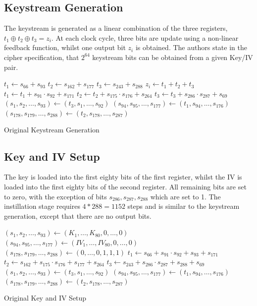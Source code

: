 \documentclass[conference]{IEEEtran}
\begin{document}
\subsection{Keystream Generation}\label{sec:key-gen-o}
The keystream is generated as a linear combination of the three registers, $t_1\oplus t_2\oplus t_3=z_i$. At each clock cycle, three bits are update using a non-linear feedback function, whilst one output bit $z_i$ is obtained. The authors state in the cipher specification, that $2^{64}$ keystream bits can be obtained from a given Key/IV pair.

\begin{algorithm}[H]
\begin{algorithmic}[1]
 
\State $t_1 \gets s_{66} + s_{93}$
\State $t_2 \gets s_{162} + s_{177}$
\State $t_3 \gets s_{243} + s_{288}$
\State
\State $z_i \gets t_1 + t_2 + t_3$
\State
\State $t_1 \gets t_1 + s_{91} \cdot s_{92} + s_{171}$
\State $t_2 \gets t_2 + s_{175} \cdot s_{176} + s_{264}$
\State $t_3 \gets t_3 + s_{286} \cdot s_{287} + s_{69}$
\State
\State $(s_1,s_2,\dots,s_{93}) \gets (t_3,s_1,\dots,s_{92})$
\State $(s_{94},s_{95},\dots,s_{177}) \gets (t_1,s_{94},\dots,s_{176})$
\State $(s_{178},s_{179},\dots,s_{288}) \gets (t_2,s_{178},\dots,s_{287})$
\EndFor
\end{algorithmic}
\caption{Original Keystream Generation}
\end{algorithm}

\subsection{Key and IV Setup}\label{sec:key-iv-o}
The key is loaded into the first eighty bits of the first register, whilst the IV is loaded into the first eighty bits of the second register. All remaining bits are set to zero, with the exception of bits $s_{286},s_{287},s_{288}$ which are set to 1. The instillation stage requires $4*288=1152$ steps and is similar to the keystream generation, except that there are no output bits.

\begin{algorithm}[H]
\begin{algorithmic}[1]
\State $(s_1,s_2,\dots,s_{93}) \gets (K_1,\dots,K_{80},0,\dots,0)$
\State $(s_{94},s_{95},\dots,s_{177}) \gets (IV_1,\dots,IV_{80},0,\dots,0)$
\State $(s_{178},s_{179},\dots,s_{288}) \gets (0,\dots,0,1,1,1)$
\State
{}
\State $t_1 \gets s_{66} + s_{91} \cdot s_{92} + s_{93} + s_{171}$
\State $t_2 \gets s_{162} + s_{175} \cdot s_{176} + s_{177} + s_{264}$
\State $t_3 \gets s_{243} + s_{286} \cdot s_{287} + s_{288}+ s_{69}$
\State
\State $(s_1,s_2,\dots,s_{93}) \gets (t_3,s_1,\dots,s_{92})$
\State $(s_{94},s_{95},\dots,s_{177}) \gets (t_1,s_{94},\dots,s_{176})$
\State $(s_{178},s_{179},\dots,s_{288}) \gets (t_2,s_{178},\dots,s_{287})$
\EndFor
\end{algorithmic}
\caption{Original Key and IV Setup}
\end{algorithm}
\end{document}
